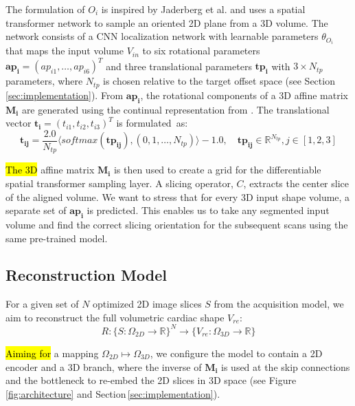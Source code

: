      The formulation of $O_i$ is inspired by Jaderberg et al. \cite{jaderberg2015spatial} and uses a spatial transformer network to sample an oriented 2D plane from a 3D volume.
    The network consists of a CNN localization network with learnable parameters $\theta_{O_i}$ that maps the input volume $V_{in}$ to six rotational parameters $\mathbf{ap_i}=\left(ap_{i1}, \dots, ap_{i6}\right)^T$ and three translational parameters  $\mathbf{tp_i}$ with $3 \times N_{tp}$ parameters, where $N_{tp}$ is chosen relative to the target offset space (see Section\,\ref{sec:implementation}). From $\mathbf{ap_i}$, the rotational components of a 3D affine matrix $\mathbf{M_i}$ are generated using the continual representation from \cite{zhou2019continuity}. The translational vector $\mathbf{t_i}=\left(t_{i1}, t_{i2}, t_{i3}\right)^T$ is formulated~as:
    \begin{equation}
        \mathbf{t_{ij}} = \frac{2.0}{N_{tp}}\langle softmax\left(\mathbf{tp_{ij}}\right), \left(0,1,\dots,N_{tp}\right)\rangle -1.0, \quad \mathbf{tp_{ij}} \in \mathbb{R}^{N_{tp}}\label{eq:translation}, j \in \left[1,2,3\right]
    \end{equation}

 \hl{The 3D} affine matrix $\mathbf{M_i}$ is then used to create a grid for the differentiable spatial transformer sampling layer. A slicing operator, $C$, extracts the center slice of the aligned volume. We want to stress that for every 3D input shape volume, a separate set of $\mathbf{ap_i}$ is predicted. This enables us to take any segmented input volume and find the correct slicing orientation for the subsequent scans using the same pre-trained model.  %

    \subsection{Reconstruction Model}
    \label{sec:method_reconstruction_model}
     For a given set of $N$ optimized 2D image slices $S$ from the acquisition model, we aim to reconstruct the full volumetric cardiac shape $V_{re}$:
    \begin{equation}
        R: \{ S:\Omega_{2D} \rightarrow \mathbb{R}\}^N \rightarrow \{V_{re}:\Omega_{3D} \rightarrow \mathbb{R}\} \label{eq:reconstruction}
    \end{equation}

    \hl{Aiming for} %
 a mapping $\Omega_{2D} \mapsto \Omega_{3D}$, we configure the model to contain a 2D encoder and a 3D branch, where the inverse of $\mathbf{M_i}$ is used at the skip connections and the bottleneck to re-embed the 2D slices in 3D space (see Figure\,\ref{fig:architecture} and Section\,\ref{sec:implementation}).

